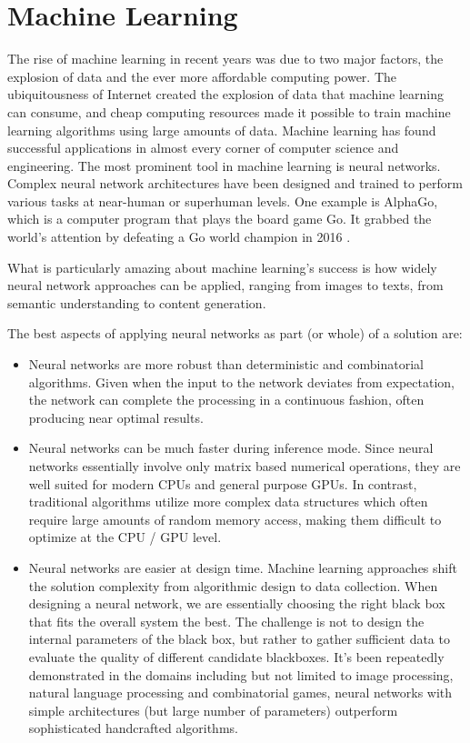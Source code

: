\section{Machine Learning}

The rise of machine learning in recent years was due to two major factors, the explosion of data and the ever more affordable computing power. The ubiquitousness of Internet created the explosion of data that machine learning can consume, and cheap computing resources made it possible to train machine learning algorithms using large amounts of data. Machine learning has found successful applications in almost every corner of computer science and engineering.  The most prominent tool in machine learning is neural networks.  Complex neural network architectures have been designed and trained to perform various tasks at near-human or superhuman levels. One example is AlphaGo, which is a computer program that plays the board game Go. It grabbed the world's attention by defeating a Go world champion in 2016 \cite{alphago}. 

What is particularly amazing about machine learning's success is how widely neural network approaches can be applied, ranging from images to texts, from semantic understanding to content generation.

The best aspects of applying neural networks as part (or whole) of a solution are:

\begin{itemize}

\item Neural networks are more robust than deterministic and combinatorial algorithms.  Given when the input to the network deviates from expectation, the network can complete the processing in a continuous fashion, often producing near optimal results.

\item Neural networks can be much faster during inference mode.  Since neural networks essentially involve only matrix based numerical operations, they are well suited for modern CPUs and general purpose GPUs.  In contrast, traditional algorithms utilize more complex data structures which often require large amounts of random memory access, making them difficult to optimize at the CPU / GPU level.

\item Neural networks are easier at design time.  Machine learning approaches shift the solution complexity from algorithmic design to data collection.  When designing a neural network, we are essentially choosing the right black box that fits the overall system the best.  The challenge is not to design the internal parameters of the black box, but rather to gather sufficient data to evaluate the quality of different candidate blackboxes.  It's been repeatedly demonstrated in the domains including but not limited to image processing, natural language processing and combinatorial games, neural networks with simple architectures (but large number of parameters) outperform sophisticated handcrafted algorithms.
\end{itemize}

